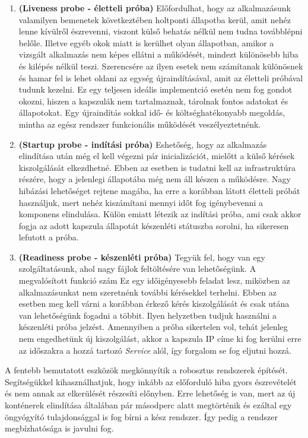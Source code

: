 \begin{enumerate}
    \item \textbf{(Liveness probe - életteli próba)} Előfordulhat, hogy az alkalmazásunk valamilyen bemenetek következtében holtponti állapotba kerül, amit nehéz lenne kívülről észrevenni, viszont külső behatás nélkül nem tudna továbblépni belőle. 
    Illetve egyéb okok miatt is kerülhet olyan állapotban, amikor a vizsgált alkalmazás nem képes ellátni a működését, mindezt különösebb hiba és kilépés nélkül teszi.
    Szerencsére az ilyen esetek nem számítanak különösnek és hamar fel is lehet oldani az egység újraindításával, amit az életteli próbával tudunk kezelni.
    Ez egy teljesen ideális implementció esetén nem fog gondot okozni, hiszen a kapszulák nem tartalmaznak, tárolnak fontos adatokat és állapotokat.
    Egy újraindítás sokkal idő- és költséghatékonyabb megoldás, mintha az egész rendszer funkcionális működését veszélyeztetnénk.

    \item \textbf{(Startup probe - indítási próba)} Eshetőség, hogy az alkalmazás elindítása után még el kell végezni pár inicializációt, mielőtt a külső kérések kiszolgálását elkezdhetné.
    Ebben az esetben is tudatni kell az infrastruktúra részére, hogy a jelenlegi állapotába még nem áll készen a működésre.
    Nagy hibázási lehetőséget rejtene magába, ha erre a korábban látott  életteli próbát használjuk, mert nehéz kiszámítani mennyi időt fog igénybevenni a komponens elindulása.
    Külön emiatt létezik az indítási próba, ami csak akkor fogja az adott kapszula állapotát készenléti státuszba sorolni, ha sikeresen lefutott a próba.

    \item \textbf{(Readiness probe - készenléti próba)} Tegyük fel, hogy van egy szolgáltatásunk, ahol nagy fájlok feltöltésére van lehetőségünk.
    A megvalósított funkció szám
    Ez egy időigényesebb feladat lesz, miközben az alkalmazásunkat nem szeretnénk további kérésekkel terhelni.
    Ebben az esetben meg kell várni a korábban érkező kérés kiszolgálását és csak utána van lehetőségünk fogadni a többit.
    Ilyen helyzetben tudjuk használni a készenléti próba jelzést. 
    Amennyiben a próba sikertelen vol, tehát jelenleg nem engedhetünk új kiszolgálást, akkor a kapszula IP címe ki fog kerülni erre az időszakra a hozzá tartozó \textit{Service} alól, így forgalom se fog eljutni hozzá. 
    
\end{enumerate}

A fentebb bemutatott eszközök megkönnyítik a robosztus rendszerek építését.
Segítségükkel kihasználhatjuk, hogy inkább az előforduló hiba gyors észrevételét és nem annak az elkerülését részesíti előnyben.
Erre lehetőség is van, mert az új konténerek elindítása általában pár másodperc alatt megtörténik és ezáltal egy öngyógyító tulajdonsággal is fog bírni a kész rendszer.
Így pedig a rendszer megbízhatósága is javulni fog. 

